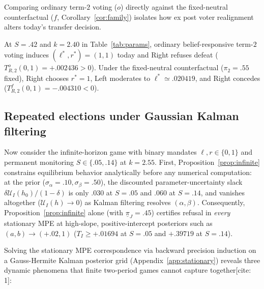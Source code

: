 Comparing ordinary term-$2$ voting ($o$) directly against the fixed-neutral counterfactual ($f$, Corollary~\ref{cor:family}) isolates how ex post voter realignment alters today's transfer decision.

\begin{result}\label{cor:feedback}
At $S=.42$ and $k=2.40$ in Table~\ref{tab:params}, ordinary belief-responsive term-$2$ voting induces $(\ell^*,r^*)=(1,1)$ today and Right refuses defeat ($T_{R,2}^o(0,1)=+.002436>0$). Under the fixed-neutral counterfactual ($\pi_2=.55$ fixed), Right chooses $r^*=1$, Left moderates to $\ell^*\simeq .020419$, and Right concedes ($T_{R,2}^f(0,1)=-.004310<0$).
\end{result}

\subsection{Repeated elections under Gaussian Kalman filtering}

Now consider the infinite-horizon game with binary mandates $\ell,r\in\{0,1\}$ and permanent monitoring $S\in\{.05,.14\}$ at $k=2.55$. First, Proposition~\ref{prop:infinite} constrains equilibrium behavior analytically before any numerical computation: at the prior ($\sigma_\alpha=.10,\sigma_\beta=.50$), the discounted parameter-uncertainty slack $\delta\mathcal U_I(h_0)/(1-\delta)$ is only $.030$ at $S=.05$ and $.060$ at $S=.14$, and vanishes altogether ($\mathcal U_I(h)\to 0$) as Kalman filtering resolves $(\alpha,\beta)$. Consequently, Proposition~\ref{prop:infinite} alone (with $\underline\pi_J=.45$) certifies refusal in \emph{every} stationary MPE at high-slope, positive-intercept posteriors such as $(a,b)\to(+.02,1)$ ($T_I\ge +.01694$ at $S=.05$ and $+.39719$ at $S=.14$).

Solving the stationary MPE correspondence via backward precision induction on a Gauss-Hermite Kalman posterior grid (Appendix~\ref{app:stationary}) reveals three dynamic phenomena that finite two-period games cannot capture together[cite: 1]:

